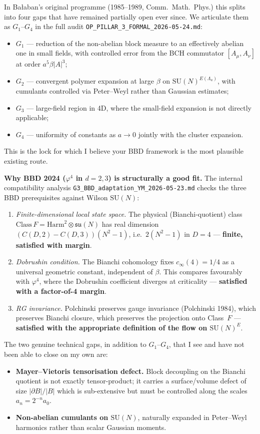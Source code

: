 \documentclass[11pt,a4paper]{article}
\newcommand{\Harm}{\mathrm{Harm}}
\newcommand{\su}[1]{\mathfrak{su}(#1)}
\newcommand{\SU}[1]{\mathrm{SU}(#1)}
\newcommand{\cinf}{c_\infty}
\begin{document}
In Bałaban's original programme (1985--1989, Comm.\ Math.\ Phys.) this splits into four gaps that have remained partially open ever since. We articulate them as $G_1$--$G_4$ in the full audit \texttt{OP\_PILLAR\_3\_FORMAL\_2026-05-24.md}:
\begin{itemize}
  \item \textbf{$G_1$} --- reduction of the non-abelian block measure to an effectively abelian one in small fields, with controlled error from the BCH commutator $[A_\mu, A_\nu]$ at order $a^5 \beta |A|^3$;
  \item \textbf{$G_2$} --- convergent polymer expansion at large $\beta$ on $\SU{N}^{E(\Lambda_a)}$, with cumulants controlled via Peter--Weyl rather than Gaussian estimates;
  \item \textbf{$G_3$} --- large-field region in 4D, where the small-field expansion is not directly applicable;
  \item \textbf{$G_4$} --- uniformity of constants as $a\to 0$ jointly with the cluster expansion.
\end{itemize}
This is the lock for which I believe your BBD framework is the most plausible existing route.

\smallskip\noindent
\textbf{Why BBD 2024 ($\varphi^4$ in $d = 2, 3$) is structurally a good fit.} The internal compatibility analysis \texttt{G3\_BBD\_adaptation\_YM\_2026-05-23.md} checks the three BBD prerequisites against Wilson $\SU{N}$:
\begin{enumerate}
  \item \emph{Finite-dimensional local state space.} The physical (Bianchi-quotient) class $\mathrm{Class}\,F = \Harm^2 \otimes \su{N}$ has real dimension $(C(D,2)-C(D,3))(N^2-1)$, i.e.\ $2(N^2-1)$ in $D=4$ --- \textbf{finite, satisfied with margin}.
  \item \emph{Dobrushin condition.} The Bianchi cohomology fixes $\cinf(4) = 1/4$ as a universal geometric constant, independent of $\beta$. This compares favourably with $\varphi^4$, where the Dobrushin coefficient diverges at criticality --- \textbf{satisfied with a factor-of-4 margin}.
  \item \emph{RG invariance.} Polchinski preserves gauge invariance (Polchinski 1984), which preserves Bianchi closure, which preserves the projection onto Class~$F$ --- \textbf{satisfied with the appropriate definition of the flow on $\SU{N}^E$}.
\end{enumerate}
The two genuine technical gaps, in addition to $G_1$--$G_4$, that I see and have not been able to close on my own are:
\begin{itemize}
  \item[(i)] \textbf{Mayer--Vietoris tensorisation defect.} Block decoupling on the Bianchi quotient is not exactly tensor-product; it carries a surface/volume defect of size $|\partial B|/|B|$ which is sub-extensive but must be controlled along the scales $a_n = 2^{-n} a_0$.
  \item[(ii)] \textbf{Non-abelian cumulants on $\SU{N}$}, naturally expanded in Peter--Weyl harmonics rather than scalar Gaussian moments.
\end{itemize}
\end{document}
